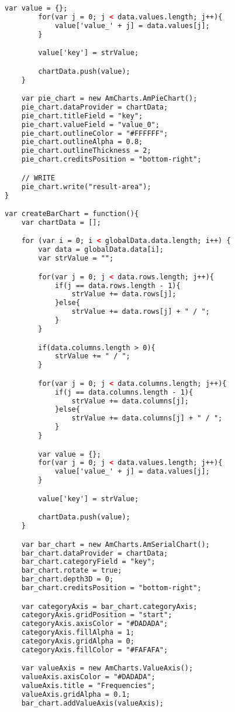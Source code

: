 \begin{lstlisting}[language=HTML,basicstyle=\tiny,caption=script.js]
        var value = {};
        for(var j = 0; j < data.values.length; j++){
            value['value_' + j] = data.values[j];
        }

        value['key'] = strValue;

        chartData.push(value);
    }

    var pie_chart = new AmCharts.AmPieChart();
    pie_chart.dataProvider = chartData;
    pie_chart.titleField = "key";
    pie_chart.valueField = "value_0";
    pie_chart.outlineColor = "#FFFFFF";
    pie_chart.outlineAlpha = 0.8;
    pie_chart.outlineThickness = 2;
    pie_chart.creditsPosition = "bottom-right";

    // WRITE
    pie_chart.write("result-area");
}

var createBarChart = function(){
    var chartData = [];

    for (var i = 0; i < globalData.data.length; i++) {
        var data = globalData.data[i];
        var strValue = "";

        for(var j = 0; j < data.rows.length; j++){
            if(j == data.rows.length - 1){
                strValue += data.rows[j];
            }else{
                strValue += data.rows[j] + " / ";
            }
        }

        if(data.columns.length > 0){
            strValue += " / ";
        }

        for(var j = 0; j < data.columns.length; j++){
            if(j == data.columns.length - 1){
                strValue += data.columns[j];
            }else{
                strValue += data.columns[j] + " / ";
            }
        }

        var value = {};
        for(var j = 0; j < data.values.length; j++){
            value['value_' + j] = data.values[j];
        }

        value['key'] = strValue;

        chartData.push(value);
    }

    var bar_chart = new AmCharts.AmSerialChart();
    bar_chart.dataProvider = chartData;
    bar_chart.categoryField = "key";
    bar_chart.rotate = true;
    bar_chart.depth3D = 0;
    bar_chart.creditsPosition = "bottom-right";

    var categoryAxis = bar_chart.categoryAxis;
    categoryAxis.gridPosition = "start";
    categoryAxis.axisColor = "#DADADA";
    categoryAxis.fillAlpha = 1;
    categoryAxis.gridAlpha = 0;
    categoryAxis.fillColor = "#FAFAFA";

    var valueAxis = new AmCharts.ValueAxis();
    valueAxis.axisColor = "#DADADA";
    valueAxis.title = "Frequencies";
    valueAxis.gridAlpha = 0.1;
    bar_chart.addValueAxis(valueAxis);


\end{lstlisting}
